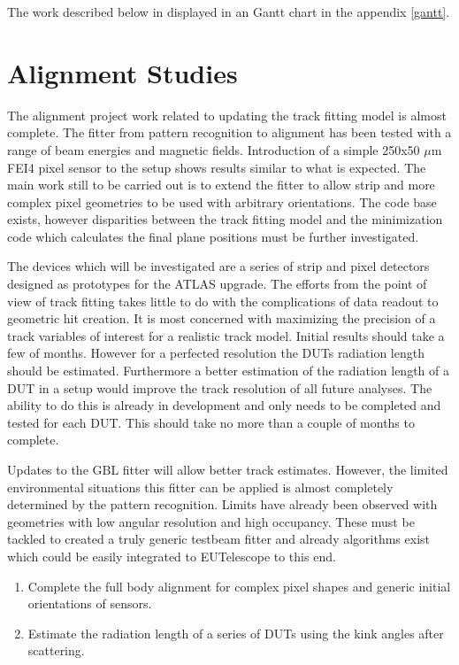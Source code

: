 The work described below in displayed in an Gantt chart in the appendix \ref{gantt}. 

\section{Alignment Studies}
The alignment project work related to updating the track fitting model is almost complete. The fitter from pattern recognition to alignment has been tested with a range of beam energies and magnetic fields. Introduction of a simple 250x50 $\mu$m FEI4 pixel sensor to the setup shows results similar to what is expected. The main work still to be carried out is to extend the fitter to allow strip and more complex pixel geometries to be used with arbitrary orientations. The code base exists, however disparities between the track fitting model and the minimization code which calculates the final plane positions must be further investigated.

The devices which will be investigated are a series of strip and pixel detectors designed as prototypes for the ATLAS upgrade. The efforts from the point of view of track fitting takes little to do with the complications of data readout to geometric hit creation. It is most concerned with maximizing the precision of a track variables of interest for a realistic track model. Initial results should take a few of months. However for a perfected resolution the DUTs radiation length should be estimated. Furthermore  a better estimation of the radiation length of a DUT in a setup would improve the track resolution of all future analyses. The ability to do this is already in development and only needs to be completed and tested for each DUT. This should take no more than a couple of months to complete. 

Updates to the GBL fitter will allow better track estimates. However, the limited environmental situations this fitter can be applied is almost completely determined by the pattern recognition. Limits have already been observed with geometries with low angular resolution and high occupancy. These must be tackled to created a truly generic testbeam fitter and already algorithms exist which could be easily integrated to EUTelescope to this end. 

\begin{enumerate}

  \item Complete the full body alignment for complex pixel shapes and generic initial orientations of sensors.
  \item Estimate the radiation length of a series of DUTs using the kink angles after scattering. 

\end{enumerate}

